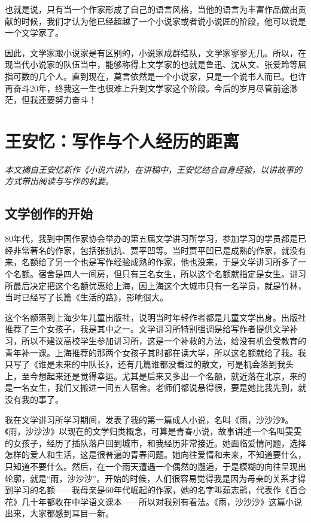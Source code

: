 \documentclass[fontset=fandol,12pt,a5paper]{ctexbook}
\begin{document}
也就是说，只有当一个作家形成了自己的语言风格，当他的语言为丰富作品做出贡献的时候，我们才认为他已经超越了一个小说家或者说小说匠的阶段，他可以说是一个文学家了。

因此，文学家跟小说家是有区别的，小说家成群结队，文学家寥寥无几。所以，在现当代小说家的队伍当中，能够称得上文学家的也就是鲁迅、沈从文、张爱玲等屈指可数的几个人。直到现在，莫言依然是一个小说家，只是一个说书人而已。也许再奋斗20年，终我这一生也很难上升到文学家这个阶段。今后的岁月尽管前途渺茫，但我还要努力奋斗！

\newpage

\section{王安忆：写作与个人经历的距离}

\emph{本文摘自王安忆新作《小说六讲》，在讲稿中，王安忆结合自身经验，以讲故事的方式带出阅读与写作的机要。}
\vspace{2em}

\subsection{文学创作的开始}
80年代，我到中国作家协会举办的第五届文学讲习所学习，参加学习的学员都是已经非常著名的作家，包括张抗抗、贾平凹等。当时贾平凹已是成熟的作家，就没有来，名额给了另一个也是写作经验成熟的作家，他也没来，于是文学讲习所多了一个名额。宿舍是四人一间房，但只有三名女生，所以这个名额就指定是女生。讲习所最后决定把这个名额优惠给上海，因上海这个大城市只有一名学员，就是竹林，当时已经写了长篇《生活的路》，影响很大。

这个名额落到上海少年儿童出版社，说明当时年轻作者都是儿童文学出身。出版社推荐了三个女孩子，我是其中之一。文学讲习所特别强调是给写作者提供文学补习，所以不建议高校学生参加讲习所，这是一个补救的方法，给没有机会受教育的青年补一课。上海推荐的那两个女孩子其时都在读大学，所以这名额就给了我。我只写了《谁是未来的中队长》，还有几篇谁都没看过的散文，可是机会落到我头上，至今想起来还是觉得幸运。尤其是后来又多出一个名额，就近落在北京，来的是一名女生，我们又搬进一间五人宿舍。老师们都说悬得很，要是她比我先到，就没有我的事了。

我在文学讲习所学习期间，发表了我的第一篇成人小说，名叫《雨，沙沙沙》。《雨，沙沙沙》以现在的文学归类概念，可算是青春小说，故事讲述一个名叫雯雯的女孩子，经历了插队落户回到城市，和我经历非常接近。她面临爱情问题，选择怎样的爱人和生活，这是很普遍的青春问题。她向往爱情和未来，不知道要什么，只知道不要什么。然后，在一个雨天遭遇一个偶然的邂逅，于是模糊的向往呈现出轮廓，就是“雨，沙沙沙”。开始的时候，人们很容易觉得我是因为母亲的关系才得到学习的名额——我母亲是60年代崛起的作家，她的名字叫茹志鹃，代表作《百合花》几十年都收在中学语文课本——所以对我别有看法。《雨，沙沙沙》这篇小说出来，大家都感到耳目一新。
\end{document}
